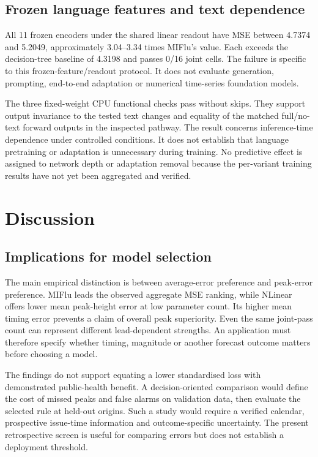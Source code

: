 \documentclass[journal,twoside,print]{ieeecolor}
\begin{document}
\subsection{Frozen language features and text dependence}
All 11 frozen encoders under the shared linear readout have MSE between 4.7374 and 5.2049, approximately 3.04--3.34 times MIFlu's value. Each exceeds the decision-tree baseline of 4.3198 and passes 0/16 joint cells. The failure is specific to this frozen-feature/readout protocol. It does not evaluate generation, prompting, end-to-end adaptation or numerical time-series foundation models.

The three fixed-weight CPU functional checks pass without skips. They support output invariance to the tested text changes and equality of the matched full/no-text forward outputs in the inspected pathway. The result concerns inference-time dependence under controlled conditions. It does not establish that language pretraining or adaptation is unnecessary during training. No predictive effect is assigned to network depth or adaptation removal because the per-variant training results have not yet been aggregated and verified.

\section{Discussion}
\subsection{Implications for model selection}
The main empirical distinction is between average-error preference and peak-error preference. MIFlu leads the observed aggregate MSE ranking, while NLinear offers lower mean peak-height error at low parameter count. Its higher mean timing error prevents a claim of overall peak superiority. Even the same joint-pass count can represent different lead-dependent strengths. An application must therefore specify whether timing, magnitude or another forecast outcome matters before choosing a model.

The findings do not support equating a lower standardised loss with demonstrated public-health benefit. A decision-oriented comparison would define the cost of missed peaks and false alarms on validation data, then evaluate the selected rule at held-out origins. Such a study would require a verified calendar, prospective issue-time information and outcome-specific uncertainty. The present retrospective screen is useful for comparing errors but does not establish a deployment threshold.
\end{document}
